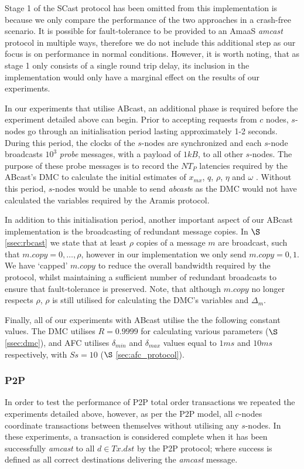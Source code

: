     Stage 1 of the \textsf{SCast} protocol has been omitted from this implementation is because we only compare the performance of the two approaches in a crash-free scenario.  It is possible for fault-tolerance to be provided to an \textsf{AmaaS} \emph{amcast} protocol in multiple ways, therefore we do not include this additional step as our focus is on performance in normal conditions.  However, it is worth noting, that as stage 1 only consists of a single round trip delay, its inclusion in the implementation would only have a marginal effect on the results of our experiments.  	
	
    In our experiments that utilise \textsf{ABcast}, an additional phase is required before the experiment detailed above can begin.  Prior to accepting requests from $c$ nodes, $s$-nodes go through an initialisation period lasting approximately 1-2 seconds.  During this period, the clocks of the $s$-nodes are synchronized and each $s$-node broadcasts $10^3$ \emph{probe} messages, with a payload of $1kB$, to all other $s$-nodes.  The purpose of these probe messages is to record the $NT_P$ latencies required by the \textsf{ABcast}'s DMC to calculate the initial estimates of $x_{mx}$, $q$, $\rho$, $\eta$ and $\omega$ .  Without this period, $s$-nodes would be unable to send \emph{abcast}s as the DMC would not have calculated the variables required by the Aramis protocol.  
    
    In addition to this initialisation period, another important aspect of our \textsf{ABcast} implementation is the broadcasting of redundant message copies.  In $\S$ \ref{ssec:rbcast} we  state that at least $\rho$ copies of a message $m$ are broadcast, such that $m.copy = 0,\ldots,\rho$, however in our implementation we only send $m.copy = 0,1$.  We have \textquoteleft{}capped' $m.copy$ to reduce the overall bandwidth required by the protocol, whilst maintaining a sufficient number of redundant broadcasts to ensure that fault-tolerance is preserved.  Note, that although $m.copy$ no longer respects $\rho$, $\rho$ is still utilised for calculating the DMC's variables and $\Delta_m$.  
    
    Finally, all of our experiments with \textsf{ABcast} utilise the the following constant values.  The DMC utilises $R=0.9999$ for calculating various parameters ($\S$ \ref{ssec:dmc}), and AFC utilises $\delta_{min}$ and $\delta_{max}$ values equal to $1ms$ and $10ms$ respectively, with $Ss = 10$ ($\S$ \ref{sec:afc_protocol}).  
	
	\subsubsection*{P2P}
	In order to test the performance of P2P total order transactions we repeated the experiments detailed above, however, as per the P2P model, all $c$-nodes coordinate transactions between themselves without utilising any $s$-nodes.  In these experiments, a transaction is considered complete when it has been successfully \emph{amcast} to all $d \in Tx.dst$ by the P2P protocol; where success is defined as all correct destinations delivering the \emph{amcast} message. 
	
